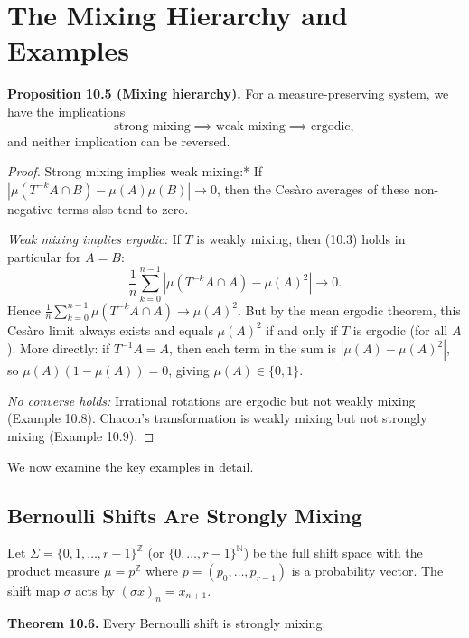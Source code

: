 \section{The Mixing Hierarchy and Examples}\label{sec:10.3}

\textbf{Proposition 10.5 (Mixing hierarchy).} For a measure-preserving system, we have the implications
\[
\text{strong mixing} \implies \text{weak mixing} \implies \text{ergodic},
\]
and neither implication can be reversed.

\begin{proof}
\textit{ }Strong mixing implies weak mixing:* If $|\mu(T^{-k}A \cap B) - \mu(A)\mu(B)| \to 0$, then the Cesàro averages of these non-negative terms also tend to zero.

\textit{Weak mixing implies ergodic:} If $T$ is weakly mixing, then (10.3) holds in particular for $A = B$:
\[
\frac{1}{n}\sum_{k=0}^{n-1} |\mu(T^{-k}A \cap A) - \mu(A)^2| \to 0.
\]
Hence $\frac{1}{n}\sum_{k=0}^{n-1}\mu(T^{-k}A \cap A) \to \mu(A)^2$. But by the mean ergodic theorem, this Cesàro limit always exists and equals $\mu(A)^2$ if and only if $T$ is ergodic (for all $A$). More directly: if $T^{-1}A = A$, then each term in the sum is $|\mu(A) - \mu(A)^2|$, so $\mu(A)(1 - \mu(A)) = 0$, giving $\mu(A) \in \{0, 1\}$.

\textit{No converse holds:} Irrational rotations are ergodic but not weakly mixing (Example 10.8). Chacon's transformation is weakly mixing but not strongly mixing (Example 10.9).
\end{proof}


We now examine the key examples in detail.

\subsection{Bernoulli Shifts Are Strongly Mixing}\label{sec:10.3.1}

Let $\Sigma = \{0, 1, \ldots, r-1\}^{\mathbb{Z}}$ (or $\{0,\ldots,r-1\}^{\mathbb{N}}$) be the full shift space with the product measure $\mu = p^{\mathbb{Z}}$ where $p = (p_0, \ldots, p_{r-1})$ is a probability vector. The shift map $\sigma$ acts by $(\sigma x)_n = x_{n+1}$.

\textbf{Theorem 10.6.} Every Bernoulli shift is strongly mixing.

